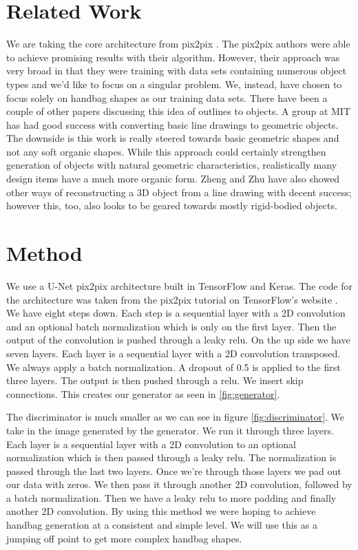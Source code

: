 \documentclass[conference]{IEEEtran}
\begin{document}
\section{Related Work}
We are taking the core architecture from pix2pix \cite{imagetoimage}. The pix2pix
authors were able to achieve promising results with their algorithm. However, their approach was
very broad in that they were training with data sets containing numerous object types and we'd like to focus on a singular problem. We, instead, have chosen to focus solely on handbag shapes as our training data sets.  There have been a couple of other
papers discussing this idea of outlines to objects. A group at MIT \cite{6247689} has
had good success with converting basic line drawings to geometric objects. The downside
is this work is really steered towards basic geometric shapes and not any soft organic shapes. While this approach could certainly strengthen generation of objects with natural geometric characteristics, realistically many design items have a much more organic form.
Zheng and Zhu \cite{zheng2022deep} have also showed other ways of reconstructing a 3D object from a line drawing with decent success; however this, too, also looks to be geared towards mostly rigid-bodied objects.


\section{Method}
We use a U-Net pix2pix architecture built in TensorFlow and Keras. The code for the
architecture was taken from the pix2pix tutorial on TensorFlow's website \cite{pix2pix}.
We have eight steps down. Each step is a sequential layer with a 2D convolution and an optional
batch normalization which is only on the first layer. Then the output of the convolution is
pushed through a leaky relu. On the up side we have seven layers. Each layer is a sequential layer
with a 2D convolution transposed. We always apply a batch normalization. A dropout of 0.5 is
applied to the first three layers. The output is then pushed through a relu. We
insert skip connections. This creates our generator as seen in \ref{fig:generator}.
\par
The discriminator is much smaller as we can see in figure \ref{fig:discriminator}. We take in the image generated by the generator. We run
it through three layers. Each layer is a sequential layer with a 2D convolution to an optional
normalization which is then passed through a leaky relu. The normalization is passed through
the last two layers. Once we're through those layers we pad out our data with zeros. We then pass it
through another 2D convolution, followed by a batch normalization. Then we have a
leaky relu to more padding and finally another 2D convolution.
By using this method we were hoping to achieve handbag generation at a consistent and simple level.
We will use this as a jumping off point to get more complex handbag shapes.
\end{document}
